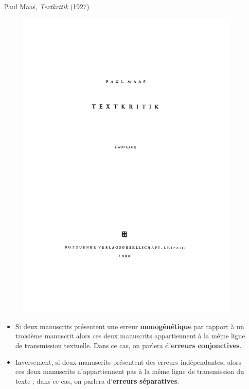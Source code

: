 \documentclass[11pt]{beamer}
\begin{document}
\begin{frame}{Paul Maas, \textit{Textkritik} (1927)}
    \begin{minipage}{.3\textwidth}
        \begin{figure}
            \centering
            \includegraphics[width=1\linewidth]{img/maas.png}
        \end{figure} 
    \end{minipage}%
    \hfill
    \begin{minipage}{.7\textwidth}
        \small{
         \begin{itemize}
            \item Si deux manuscrits présentent une erreur \textbf{monogénétique} par rapport à un troisième manuscrit alors ces deux manuscrits appartiennent à la même ligne de transmission textuelle. Dans ce cas, on parlera d'\textbf{erreurs conjonctives}.
            \item Inversement, si deux manuscrits présentent des erreurs indépendantes, alors ces deux manuscrits n'appartiennent pas à la même ligne de transmission du texte ; dans ce cas, on parlera d'\textbf{erreurs séparatives}.
        \end{itemize}
        }
    \end{minipage}
\end{frame}
\end{document}
